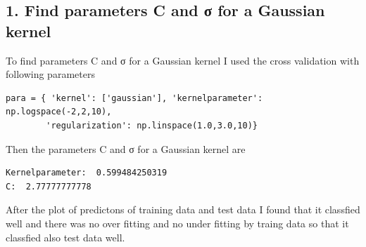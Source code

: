 \documentclass[a4paper,11pt]{article}
\begin{document}
\subsection*{1. Find parameters C and σ for a Gaussian kernel}
To find parameters C and σ for a Gaussian kernel I used the cross validation with following parameters

\begin{verbatim}
para = { 'kernel': ['gaussian'], 'kernelparameter': np.logspace(-2,2,10), 
		'regularization': np.linspace(1.0,3.0,10)}
\end{verbatim}

Then the parameters C and σ for a Gaussian kernel are

\begin{verbatim}
Kernelparameter:  0.599484250319
C:  2.77777777778
\end{verbatim}

After the plot of predictons of training data and test data I found that it classfied well and there was no over fitting and no under fitting by traing data so that it classfied also test data well.

\begin{verbatim}



\end{verbatim}
\end{document}
